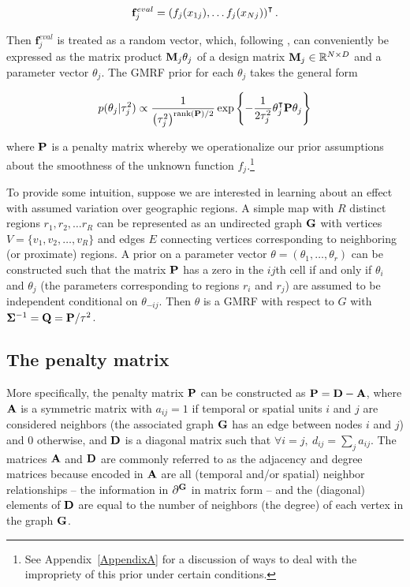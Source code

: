 \begin{equation*}
\mathbf{f}_j^{eval} = \left(f_j(x_{1j}), \dots f_j(x_{Nj})\right)^\intercal.  
 \end{equation*}
 
\noindent Then $\mathbf{f}_j^{eval}$ is treated as a random vector, which, following , can conveniently be expressed as the matrix product $\mathbf{M}_j \theta_j$ of a design matrix $\mathbf{M}_j \in \mathbb{R}^{N \times D}$ and a parameter vector $\theta_j$. The GMRF prior for each $\theta_j$ takes the general form

\begin{equation*}
p(\theta_j | \tau^2_j) 
\propto 
\frac{1}{\left(\tau^2_j\right)^{{\rm rank}(\mathbf{P})/2} }
\exp{\left\{-\frac{1}{2\tau^2_j} \theta_j^\intercal \mathbf{P} \theta_j\right\}}
\end{equation*}

\noindent where $\mathbf{P}$ is a penalty matrix whereby we operationalize our prior assumptions about the smoothness of the unknown function $f_j$.\footnote{See Appendix~\ref{AppendixA} for a discussion of ways to deal with the impropriety of this prior under certain conditions.}

To provide some intuition, suppose we are interested in learning about an effect with assumed variation over geographic regions.  A simple map with $R$ distinct regions $r_1, r_2, \dots r_R$ can be represented as an undirected graph $\mathbf{G}$ with vertices $V = \{v_1, v_2, \dots, v_R\}$ and edges $E$ connecting vertices corresponding to neighboring (or proximate) regions. A prior on a parameter vector $\theta = (\theta_1, \dots, \theta_r)$ can be constructed such that the matrix $\mathbf{P}$ has a zero in the $ij$th cell if and only if $\theta_i$ and $\theta_j$ (the parameters corresponding to regions $r_i$ and $r_j$) are assumed to be independent conditional on $\theta_{-ij}$. Then $\theta$ is a GMRF with respect to $G$ with $\boldsymbol{\Sigma}^{-1} = \mathbf{Q} = \mathbf{P}/\tau^2$. 

\subsection{The penalty matrix} 
\label{penalty_matrix}

More specifically, the penalty matrix $\mathbf{P}$ can be constructed as  $\mathbf{P} = \mathbf{D} - \mathbf{A}$, where $\mathbf{A}$ is a symmetric matrix with $a_{ij} = 1$ if temporal or spatial units $i$ and $j$ are considered neighbors (the associated graph $\mathbf{G}$ has an edge between nodes $i$ and $j$) and 0 otherwise, and $\mathbf{D}$ is a diagonal matrix such that $\forall i = j, \: d_{ij} = \sum_j a_{ij}$. The matrices $\mathbf{A}$ and $\mathbf{D}$ are commonly referred to as the adjacency and degree matrices because encoded in $\mathbf{A}$ are all (temporal and/or spatial) neighbor relationships -- the information in $\partial^{\mathbf{G}}$ in matrix form -- and the (diagonal) elements of $\mathbf{D}$ are equal to the number of neighbors (the degree) of each vertex in the graph $\mathbf{G}$. 

